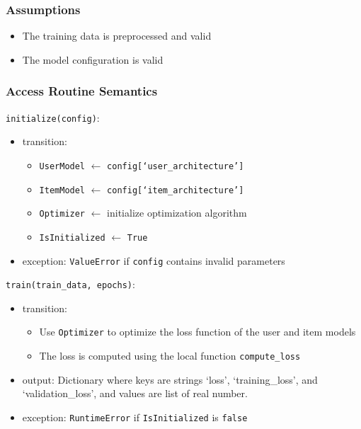 \documentclass[12pt, titlepage]{article}
\begin{document}
\subsubsection{Assumptions}

\begin{itemize}
  \item The training data is preprocessed and valid
  \item The model configuration is valid
\end{itemize}

\subsubsection{Access Routine Semantics}

\noindent \texttt{initialize(config)}:
\begin{itemize}
\item transition:
\begin{itemize}
  \item \texttt{UserModel} $\leftarrow$ \texttt{config[`user\_architecture']}
  \item \texttt{ItemModel} $\leftarrow$ \texttt{config[`item\_architecture']}
  \item \texttt{Optimizer} $\leftarrow$ initialize optimization algorithm
  \item \texttt{IsInitialized} $\leftarrow$ \texttt{True}
\end{itemize}
\item exception: \texttt{ValueError} if \texttt{config} contains invalid parameters
\end{itemize}

\noindent \texttt{train(train\_data, epochs)}:
\begin{itemize}
\item transition:
\begin{itemize}
  \item Use \texttt{Optimizer} to optimize the loss function of the user and item models
  \item The loss is computed using the local function \texttt{compute\_loss}
\end{itemize}
\item output: Dictionary where keys are strings `loss', `training\_loss', and `validation\_loss', and values are list of real number.
\item exception: \texttt{RuntimeError} if \texttt{IsInitialized} is \texttt{false}
\end{itemize}
\end{document}
